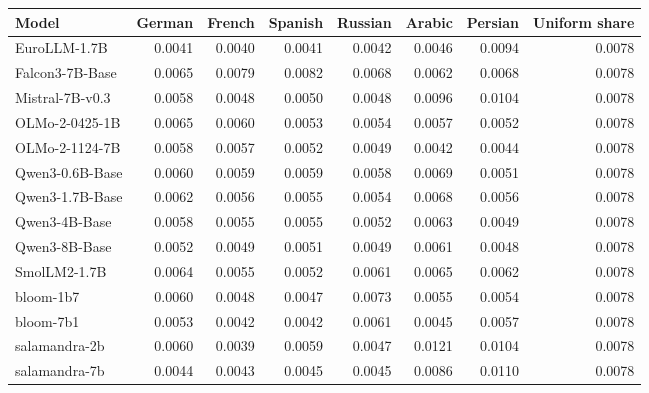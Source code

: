 \begin{center}\scriptsize
\begin{tabular}{lrrrrrrr}
\toprule
Model & German & French & Spanish & Russian & Arabic & Persian & Uniform share \\
\midrule
EuroLLM-1.7B & 0.0041 & 0.0040 & 0.0041 & 0.0042 & 0.0046 & 0.0094 & 0.0078 \\
Falcon3-7B-Base & 0.0065 & 0.0079 & 0.0082 & 0.0068 & 0.0062 & 0.0068 & 0.0078 \\
Mistral-7B-v0.3 & 0.0058 & 0.0048 & 0.0050 & 0.0048 & 0.0096 & 0.0104 & 0.0078 \\
OLMo-2-0425-1B & 0.0065 & 0.0060 & 0.0053 & 0.0054 & 0.0057 & 0.0052 & 0.0078 \\
OLMo-2-1124-7B & 0.0058 & 0.0057 & 0.0052 & 0.0049 & 0.0042 & 0.0044 & 0.0078 \\
Qwen3-0.6B-Base & 0.0060 & 0.0059 & 0.0059 & 0.0058 & 0.0069 & 0.0051 & 0.0078 \\
Qwen3-1.7B-Base & 0.0062 & 0.0056 & 0.0055 & 0.0054 & 0.0068 & 0.0056 & 0.0078 \\
Qwen3-4B-Base & 0.0058 & 0.0055 & 0.0055 & 0.0052 & 0.0063 & 0.0049 & 0.0078 \\
Qwen3-8B-Base & 0.0052 & 0.0049 & 0.0051 & 0.0049 & 0.0061 & 0.0048 & 0.0078 \\
SmolLM2-1.7B & 0.0064 & 0.0055 & 0.0052 & 0.0061 & 0.0065 & 0.0062 & 0.0078 \\
bloom-1b7 & 0.0060 & 0.0048 & 0.0047 & 0.0073 & 0.0055 & 0.0054 & 0.0078 \\
bloom-7b1 & 0.0053 & 0.0042 & 0.0042 & 0.0061 & 0.0045 & 0.0057 & 0.0078 \\
salamandra-2b & 0.0060 & 0.0039 & 0.0059 & 0.0047 & 0.0121 & 0.0104 & 0.0078 \\
salamandra-7b & 0.0044 & 0.0043 & 0.0045 & 0.0045 & 0.0086 & 0.0110 & 0.0078 \\
\bottomrule
\end{tabular}
\end{center}
